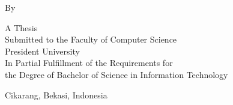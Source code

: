 \begin{titlepage}
   \begin{center}
	\vspace*{1cm}
	
	\Large \bfseries \MakeUppercase{\@title}
	
	\vfill
	
	By\\
	\@author
	
	\vfill
	
	A Thesis\\
	Submitted to the Faculty of Computer Science\\
	President University\\
	In Partial Fulfillment of the Requirements for\\
	the Degree of Bachelor of Science in Information Technology
	
	\vspace{0.8cm}
	
	Cikarang, Bekasi, Indonesia\\
	\@date
	
\end{center}
\end{titlepage}